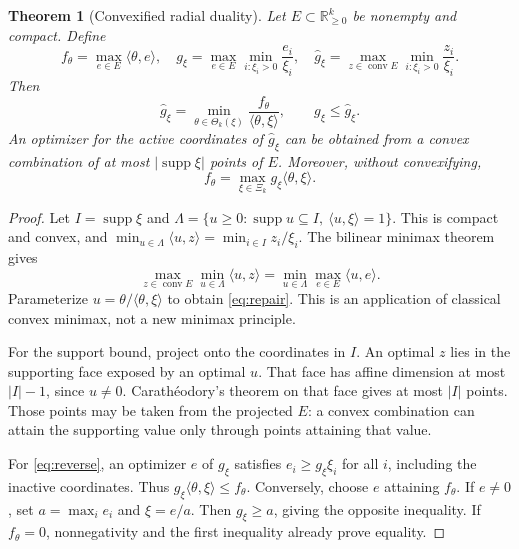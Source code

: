 \documentclass[11pt,a4paper]{article}
\newtheorem{theorem}{Theorem}
\newcommand{\R}{\mathbb R}
\newcommand{\conv}{\operatorname{conv}}
\newcommand{\supp}{\operatorname{supp}}
\begin{document}
\begin{theorem}[Convexified radial duality]\label{thm:convex}
Let \(E\subset\R_{\ge0}^k\) be nonempty and compact. Define
\[
 f_\theta=\max_{e\in E}\langle\theta,e\rangle,\quad
 g_\xi=\max_{e\in E}\min_{i:\xi_i>0}\frac{e_i}{\xi_i},\quad
 \widehat g_\xi=\max_{z\in\conv E}
                    \min_{i:\xi_i>0}\frac{z_i}{\xi_i}.
\]
Then
\begin{equation}
 \widehat g_\xi
 =\min_{\theta\in\Theta_k(\xi)}
       \frac{f_\theta}{\langle\theta,\xi\rangle},
 \qquad g_\xi\le\widehat g_\xi.
 \label{eq:repair}
\end{equation}
An optimizer for the active coordinates of \(\widehat g_\xi\)
can be obtained from a convex combination of at most
\(|\supp\xi|\) points of \(E\). Moreover, without convexifying,
\begin{equation}
 f_\theta=\max_{\xi\in\Xi_k}g_\xi\langle\theta,\xi\rangle.
 \label{eq:reverse}
\end{equation}
\end{theorem}
\begin{proof}
Let \(I=\supp\xi\) and
\(\Lambda=\{u\ge0:\supp u\subseteq I,\ \langle u,\xi\rangle=1\}\).
This is compact and convex, and
\(\min_{u\in\Lambda}\langle u,z\rangle=\min_{i\in I}z_i/\xi_i\).
The bilinear minimax theorem gives
\[
 \max_{z\in\conv E}\min_{u\in\Lambda}\langle u,z\rangle
 =\min_{u\in\Lambda}\max_{e\in E}\langle u,e\rangle.
\]
Parameterize \(u=\theta/\langle\theta,\xi\rangle\) to obtain
\eqref{eq:repair}. This is an application of classical convex
minimax, not a new minimax principle.

For the support bound, project onto the coordinates in \(I\).
An optimal \(z\) lies in the supporting face exposed by an optimal
\(u\). That face has affine dimension at most \(|I|-1\), since
\(u\ne0\). Carath\'eodory's theorem on that face gives at most
\(|I|\) points. Those points may be taken from the projected \(E\):
a convex combination can attain the supporting value only through
points attaining that value.

For \eqref{eq:reverse}, an optimizer \(e\) of \(g_\xi\) satisfies
\(e_i\ge g_\xi\xi_i\) for all \(i\), including the inactive coordinates.
Thus \(g_\xi\langle\theta,\xi\rangle\le f_\theta\).
Conversely, choose \(e\) attaining \(f_\theta\). If \(e\ne0\), set
\(a=\max_i e_i\) and \(\xi=e/a\). Then \(g_\xi\ge a\), giving the
opposite inequality. If \(f_\theta=0\), nonnegativity and the first
inequality already prove equality.
\end{proof}
\end{document}
